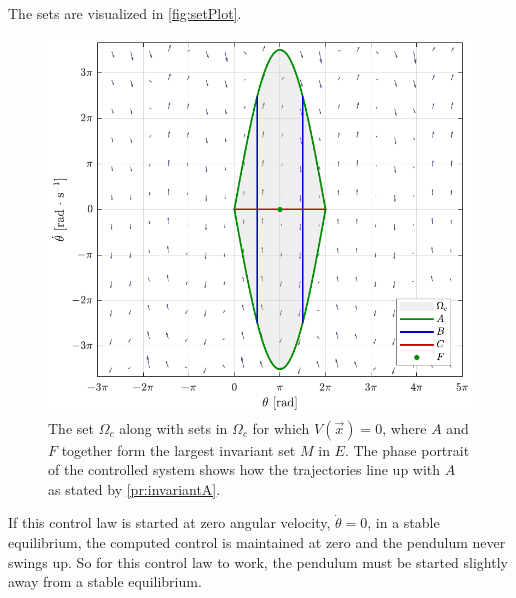 %
The sets are visualized in \autoref{fig:setPlot}.
\begin{figure}[H]
  \includegraphics[width=.65\textwidth]{figures/setPlot}
  \caption{The set $\Omega_c$ along with sets in $\Omega_c$ for which $V(\vec{x}) = 0$, where $A$ and $F$ together form the largest invariant set $M$ in $E$. The phase portrait of the controlled system shows how the trajectories line up with $A$ as stated by \autoref{pr:invariantA}.}
  \label{fig:setPlot}
\end{figure}
%
If this control law is started at zero angular velocity, $\dot{\theta} = 0$, in a stable equilibrium, the computed control is maintained at zero and the pendulum never swings up. So for this control law to work, the pendulum must be started slightly away from a stable equilibrium.

